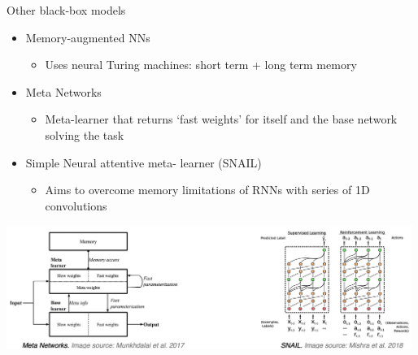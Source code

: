 \begin{frame}{Other black-box models}
    \begin{itemize}
        \item Memory-augmented NNs 
        \begin{itemize}
            \item Uses neural Turing machines: short term + long term memory
        \end{itemize}
        \item Meta Networks 
        \begin{itemize}
            \item Meta-learner that returns ‘fast weights’ for itself and the base network solving the task
        \end{itemize}
        \item Simple Neural attentive meta- learner (SNAIL)
        \begin{itemize}
            \item Aims to overcome memory limitations of RNNs with series of 1D convolutions
        \end{itemize}
    \end{itemize}
    \centering\includegraphics[height=4cm]{image/img014112.jpg}
\end{frame}

